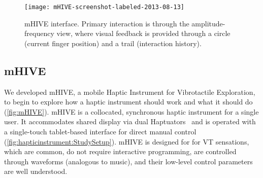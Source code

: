 %
%

\begin{figure}[Htb]
   \centering
	   \texttt{[image: mHIVE-screenshot-labeled-2013-08-13]} 
	   \caption{mHIVE interface. Primary interaction is through the amplitude-frequency view, where visual feedback is provided through a circle (current finger position) and a trail (interaction history).}
	   \label{fig:mHIVE}
    \end{figure}



\subsection{mHIVE}%
We developed mHIVE, a mobile Haptic Instrument for Vibrotactile Exploration, to begin to explore how a haptic instrument should work and what it should do (\autoref{fig:mHIVE}).
%
%
mHIVE is a collocated, synchronous haptic instrument for a single user. It accommodates shared display via dual
Haptuators~\cite{Yao2010}
and is operated with a single-touch tablet-based interface for direct manual control (\autoref{fig:hapticinstrument:StudySetup}). 
mHIVE is designed for for VT
sensations, which are common, do not require interactive programming, are controlled through waveforms (analogous to music), and their low-level control parameters are well understood.



